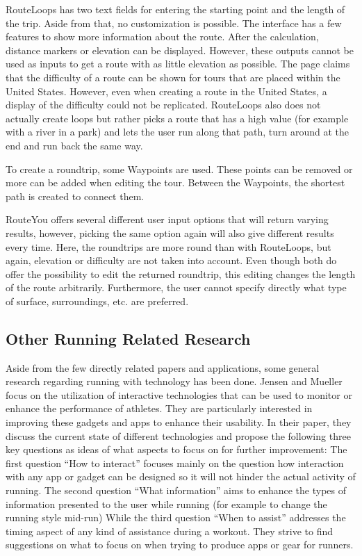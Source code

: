 RouteLoops has two text fields for entering the starting point and the length of the trip.
Aside from that, no customization is possible.
The interface has a few features to show more information about the route.
After the calculation, distance markers or elevation can be displayed.
However, these outputs cannot be used as inputs to get a route with as little elevation as possible.
The page claims that the difficulty of a route can be shown for tours that are placed within the United States.
However, even when creating a route in the United States, a display of the difficulty could not be replicated. 
RouteLoops also does not actually create loops but rather picks a route that has a high value (for example with a river in a park) and lets the user run along that path, turn around at the end and run back the same way.

To create a roundtrip, some Waypoints are used. 
These points can be removed or more can be added when editing the tour.
Between the Waypoints, the shortest path is created to connect them. 

RouteYou offers several different user input options that will return varying results, however, picking the same option again will also give different results every time.   
Here, the roundtrips are more round than with RouteLoops, but again, elevation or difficulty are not taken into account. 
Even though both do offer the possibility to edit the returned roundtrip, this editing changes the length of the route arbitrarily.
Furthermore, the user cannot specify directly what type of surface, surroundings, etc. are preferred. 




\subsection{Other Running Related Research}
\label{subsec:otherRunningResearch}

Aside from the few directly related papers and applications, some general research regarding running with technology has been done.
Jensen and Mueller \cite{jensen_running_2014} focus on the utilization of interactive technologies that can be used to monitor or enhance the performance of athletes.
They are particularly interested in improving these gadgets and apps to enhance their usability. 
In their paper, they discuss the current state of different technologies and propose the following three key questions as ideas of what aspects to focus on for further improvement:
The first question \enquote{How to interact} focuses mainly on the question how interaction with any app or gadget can be designed so it will not hinder the actual activity of running.
The second question \enquote{What information} aims to enhance the types of information presented to the user while running (for example to change the running style mid-run)
While the third question \enquote{When to assist} addresses the timing aspect of any kind of assistance during a workout. 
They strive to find suggestions on what to focus on when trying to produce apps or gear for runners.



